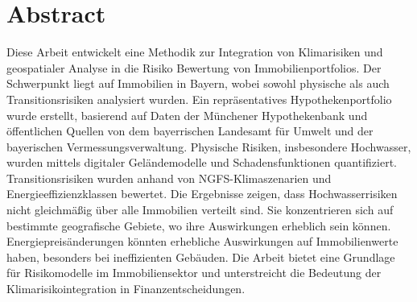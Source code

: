 

\section*{Abstract}
Diese Arbeit entwickelt eine Methodik zur Integration von Klimarisiken und geospatialer Analyse in die Risiko Bewertung von Immobilienportfolios. Der Schwerpunkt liegt auf Immobilien in Bayern, wobei sowohl physische als auch Transitionsrisiken analysiert wurden. Ein repräsentatives Hypothekenportfolio wurde erstellt, basierend auf Daten der Münchener Hypothekenbank und öffentlichen Quellen von dem bayerrischen Landesamt für Umwelt und der bayerischen Vermessungsverwaltung. Physische Risiken, insbesondere Hochwasser, wurden mittels digitaler Geländemodelle und Schadensfunktionen quantifiziert. Transitionsrisiken wurden anhand von \ac{NGFS}-Klimaszenarien und Energieeffizienzklassen bewertet. Die Ergebnisse zeigen, dass Hochwasserrisiken nicht gleichmäßig über alle Immobilien verteilt sind. Sie konzentrieren sich auf bestimmte geografische Gebiete, wo ihre Auswirkungen erheblich sein können. Energiepreisänderungen könnten erhebliche Auswirkungen auf Immobilienwerte haben, besonders bei ineffizienten Gebäuden. Die Arbeit bietet eine Grundlage für Risikomodelle im Immobiliensektor und unterstreicht die Bedeutung der Klimarisikointegration in Finanzentscheidungen.



